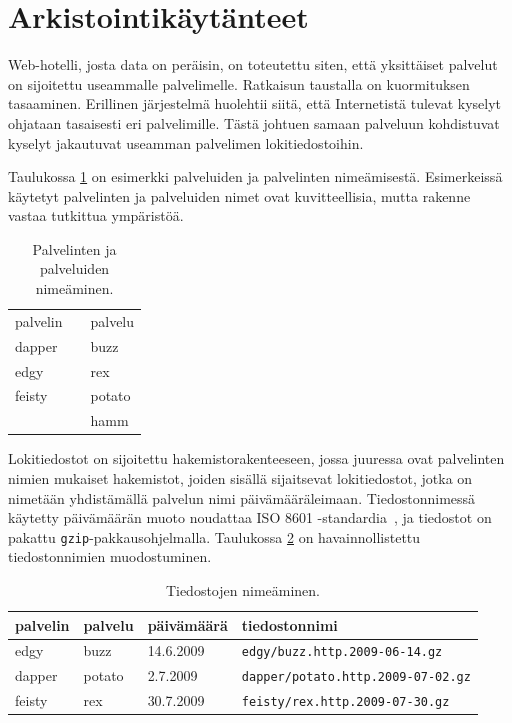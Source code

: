\section{Arkistointikäytänteet}

Web-hotelli, josta data on peräisin, on toteutettu siten, että yksittäiset palvelut on
sijoitettu useammalle palvelimelle. Ratkaisun taustalla on
kuormituksen tasaaminen. Erillinen järjestelmä huolehtii siitä, että
Internetistä tulevat kyselyt ohjataan tasaisesti eri
palvelimille. Tästä johtuen samaan palveluun kohdistuvat kyselyt
jakautuvat useamman palvelimen lokitiedostoihin.

Taulukossa \ref{nimet} on esimerkki palveluiden ja palvelinten
nimeämisestä. Esimerkeissä käytetyt palvelinten ja palveluiden nimet
ovat kuvitteellisia, mutta rakenne vastaa tutkittua ympäristöä.

\begin{table}[h]
\centering
\begin{tabular}{lll}
palvelin && palvelu \\
\cline{1-1}\cline{3-3}
dapper && buzz \\
edgy && rex \\
feisty && potato \\
&& hamm \\
\end{tabular}
\caption{Palvelinten ja palveluiden nimeäminen.}
\label{nimet}
\end{table}

Lokitiedostot on sijoitettu hakemistorakenteeseen, jossa juuressa ovat
palvelinten nimien mukaiset hakemistot, joiden sisällä sijaitsevat
lokitiedostot, jotka on nimetään yhdistämällä palvelun nimi
päivämääräleimaan. Tiedostonnimessä käytetty päivämäärän muoto
noudattaa ISO 8601 -standardia~\cite{iso8601}, ja tiedostot on pakattu
\texttt{gzip}-pakkausohjelmalla. Taulukossa \ref{tiedostot}
on havainnollistettu tiedostonnimien muodostuminen.

\begin{table}[h]
\centering
\begin{tabular}{llll}
palvelin & palvelu & päivämäärä & tiedostonnimi \\
\hline
edgy & buzz & 14.6.2009 & \texttt{edgy/buzz.http.2009-06-14.gz}\\ 
dapper & potato & 2.7.2009 & \texttt{dapper/potato.http.2009-07-02.gz}\\
feisty & rex & 30.7.2009 & \texttt{feisty/rex.http.2009-07-30.gz}\\
\end{tabular}
\caption{Tiedostojen nimeäminen.}
\label{tiedostot}
\end{table}

